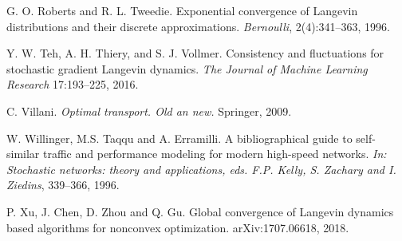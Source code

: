 \documentclass[a4paper]{article}
\begin{document}
\begin{thebibliography}{00}

G. O. Roberts and R. L. Tweedie.
\newblock Exponential convergence of Langevin distributions and their discrete approximations.
\newblock \emph{Bernoulli}, 2(4):341--363, 1996.

 Y. W. Teh, A. H. Thiery, and S. J. Vollmer.
\newblock Consistency and fluctuations for stochastic gradient Langevin dynamics.
\newblock \emph{The Journal of Machine Learning Research} 17:193--225, 2016.

 C. Villani.
\newblock \emph{Optimal transport. Old an new.}
\newblock Springer, 2009.

 W. Willinger, M.S. Taqqu and A. Erramilli.
\newblock A bibliographical guide to self-similar traffic and
performance modeling for modern high-speed networks.
\newblock\emph{In: Stochastic networks: theory and applications, 
eds. F.P. Kelly, S. Zachary and I. Ziedins}, 339--366, 1996.

 P. Xu, J. Chen, D. Zhou and Q. Gu.
\newblock Global convergence of Langevin dynamics based
algorithms for nonconvex optimization.
\newblock arXiv:1707.06618, 2018.







\end{thebibliography}
\end{document}
